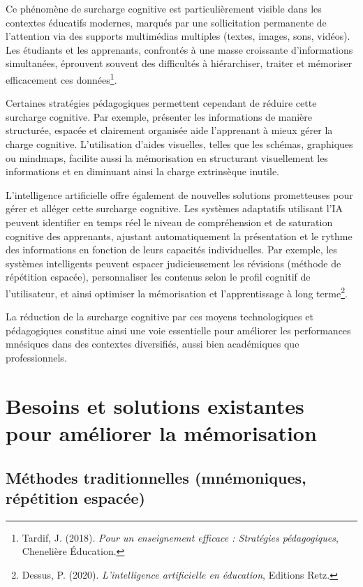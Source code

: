 \documentclass[11pt,a4paper]{report}
\begin{document}
Ce phénomène de surcharge cognitive est particulièrement visible dans les contextes éducatifs modernes, marqués par une sollicitation permanente de l'attention via des supports multimédias multiples (textes, images, sons, vidéos). Les étudiants et les apprenants, confrontés à une masse croissante d’informations simultanées, éprouvent souvent des difficultés à hiérarchiser, traiter et mémoriser efficacement ces données\footnote{Tardif, J. (2018). \textit{Pour un enseignement efficace : Stratégies pédagogiques}, Chenelière Éducation.}.

Certaines stratégies pédagogiques permettent cependant de réduire cette surcharge cognitive. Par exemple, présenter les informations de manière structurée, espacée et clairement organisée aide l’apprenant à mieux gérer la charge cognitive. L'utilisation d’aides visuelles, telles que les schémas, graphiques ou mindmaps, facilite aussi la mémorisation en structurant visuellement les informations et en diminuant ainsi la charge extrinsèque inutile.

L’intelligence artificielle offre également de nouvelles solutions prometteuses pour gérer et alléger cette surcharge cognitive. Les systèmes adaptatifs utilisant l'IA peuvent identifier en temps réel le niveau de compréhension et de saturation cognitive des apprenants, ajustant automatiquement la présentation et le rythme des informations en fonction de leurs capacités individuelles. Par exemple, les systèmes intelligents peuvent espacer judicieusement les révisions (méthode de répétition espacée), personnaliser les contenus selon le profil cognitif de l’utilisateur, et ainsi optimiser la mémorisation et l'apprentissage à long terme\footnote{Dessus, P. (2020). \textit{L'intelligence artificielle en éducation}, Editions Retz.}.

La réduction de la surcharge cognitive par ces moyens technologiques et pédagogiques constitue ainsi une voie essentielle pour améliorer les performances mnésiques dans des contextes diversifiés, aussi bien académiques que professionnels.

\section{Besoins et solutions existantes pour améliorer la mémorisation}

\subsection{Méthodes traditionnelles (mnémoniques, répétition espacée)}
\end{document}
